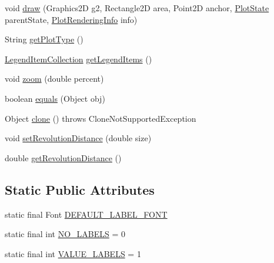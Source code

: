 \begin{DoxyCompactItemize}
void \mbox{\hyperlink{classorg_1_1jfree_1_1chart_1_1plot_1_1_compass_plot_a4bbc7ab79ce22f7d626cd7618cc40005}{draw}} (Graphics2D g2, Rectangle2D area, Point2D anchor, \mbox{\hyperlink{classorg_1_1jfree_1_1chart_1_1plot_1_1_plot_state}{Plot\+State}} parent\+State, \mbox{\hyperlink{classorg_1_1jfree_1_1chart_1_1plot_1_1_plot_rendering_info}{Plot\+Rendering\+Info}} info)
\item 
String \mbox{\hyperlink{classorg_1_1jfree_1_1chart_1_1plot_1_1_compass_plot_a8e718349345edda7a589aac440b40d88}{get\+Plot\+Type}} ()
\item 
\mbox{\hyperlink{classorg_1_1jfree_1_1chart_1_1_legend_item_collection}{Legend\+Item\+Collection}} \mbox{\hyperlink{classorg_1_1jfree_1_1chart_1_1plot_1_1_compass_plot_adc5fd675872d34dce951cb40937152bb}{get\+Legend\+Items}} ()
\item 
void \mbox{\hyperlink{classorg_1_1jfree_1_1chart_1_1plot_1_1_compass_plot_ad76cee676a42d06555facc2034629f25}{zoom}} (double percent)
\item 
boolean \mbox{\hyperlink{classorg_1_1jfree_1_1chart_1_1plot_1_1_compass_plot_a6897e0805354c09a125c8249222ee8e9}{equals}} (Object obj)
\item 
Object \mbox{\hyperlink{classorg_1_1jfree_1_1chart_1_1plot_1_1_compass_plot_a68a4bc1b25766cd7b8b8dfd5b4ed574d}{clone}} ()  throws Clone\+Not\+Supported\+Exception 
\item 
void \mbox{\hyperlink{classorg_1_1jfree_1_1chart_1_1plot_1_1_compass_plot_af4c2e6bbaa76fa95d34cc0fd3b6237fe}{set\+Revolution\+Distance}} (double size)
\item 
double \mbox{\hyperlink{classorg_1_1jfree_1_1chart_1_1plot_1_1_compass_plot_a2ef264b10a5113a67d757d908a2f4d68}{get\+Revolution\+Distance}} ()
\end{DoxyCompactItemize}
\subsection*{Static Public Attributes}
\begin{DoxyCompactItemize}
\item 
static final Font \mbox{\hyperlink{classorg_1_1jfree_1_1chart_1_1plot_1_1_compass_plot_ad2238fb5887179ece4d779227d45a6ad}{D\+E\+F\+A\+U\+L\+T\+\_\+\+L\+A\+B\+E\+L\+\_\+\+F\+O\+NT}}
\item 
static final int \mbox{\hyperlink{classorg_1_1jfree_1_1chart_1_1plot_1_1_compass_plot_aacee7aaaf48f3533c090c727ad84f846}{N\+O\+\_\+\+L\+A\+B\+E\+LS}} = 0
\item 
static final int \mbox{\hyperlink{classorg_1_1jfree_1_1chart_1_1plot_1_1_compass_plot_aa8a73d04fdb2883067183121de51ecf5}{V\+A\+L\+U\+E\+\_\+\+L\+A\+B\+E\+LS}} = 1
\end{DoxyCompactItemize}
